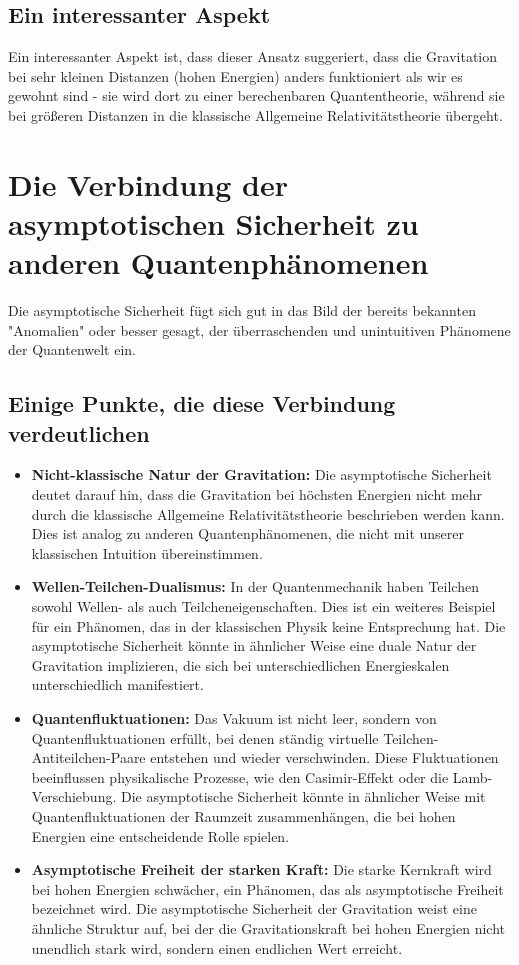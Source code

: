 \documentclass{article}
\begin{document}
\subsection{Ein interessanter Aspekt}

Ein interessanter Aspekt ist, dass dieser Ansatz suggeriert, dass die Gravitation bei sehr kleinen Distanzen (hohen Energien) anders funktioniert als wir es gewohnt sind - sie wird dort zu einer berechenbaren Quantentheorie, während sie bei größeren Distanzen in die klassische Allgemeine Relativitätstheorie übergeht.

\section{Die Verbindung der asymptotischen Sicherheit zu anderen Quantenphänomenen}

Die asymptotische Sicherheit fügt sich gut in das Bild der bereits bekannten "Anomalien" oder besser gesagt, der überraschenden und unintuitiven Phänomene der Quantenwelt ein.

\subsection{Einige Punkte, die diese Verbindung verdeutlichen}

\begin{itemize}
	\item \textbf{Nicht-klassische Natur der Gravitation:} Die asymptotische Sicherheit deutet darauf hin, dass die Gravitation bei höchsten Energien nicht mehr durch die klassische Allgemeine Relativitätstheorie beschrieben werden kann. Dies ist analog zu anderen Quantenphänomenen, die nicht mit unserer klassischen Intuition übereinstimmen.
	\item \textbf{Wellen-Teilchen-Dualismus:} In der Quantenmechanik haben Teilchen sowohl Wellen- als auch Teilcheneigenschaften. Dies ist ein weiteres Beispiel für ein Phänomen, das in der klassischen Physik keine Entsprechung hat. Die asymptotische Sicherheit könnte in ähnlicher Weise eine duale Natur der Gravitation implizieren, die sich bei unterschiedlichen Energieskalen unterschiedlich manifestiert.
	\item \textbf{Quantenfluktuationen:} Das Vakuum ist nicht leer, sondern von Quantenfluktuationen erfüllt, bei denen ständig virtuelle Teilchen-Antiteilchen-Paare entstehen und wieder verschwinden. Diese Fluktuationen beeinflussen physikalische Prozesse, wie den Casimir-Effekt oder die Lamb-Verschiebung. Die asymptotische Sicherheit könnte in ähnlicher Weise mit Quantenfluktuationen der Raumzeit zusammenhängen, die bei hohen Energien eine entscheidende Rolle spielen.
	\item \textbf{Asymptotische Freiheit der starken Kraft:} Die starke Kernkraft wird bei hohen Energien schwächer, ein Phänomen, das als asymptotische Freiheit bezeichnet wird. Die asymptotische Sicherheit der Gravitation weist eine ähnliche Struktur auf, bei der die Gravitationskraft bei hohen Energien nicht unendlich stark wird, sondern einen endlichen Wert erreicht.
\end{itemize}
\end{document}
